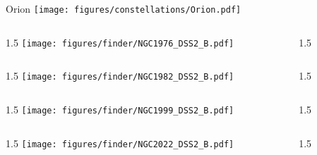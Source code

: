 \documentclass[final]{beamer}
\newlength{\colwidth}
\begin{document}

\begin{frame}[t]{\LARGE Orion}
    \centering
    \texttt{[image: figures/constellations/Orion.pdf]}
\end{frame}


\begin{frame}[t]{}
    \begin{columns}[T]
        \begin{column}{1.5\colwidth}
            \centering
            \texttt{[image: figures/finder/NGC1976\_DSS2\_B.pdf]}
        \end{column}
        \begin{column}{1.5\colwidth}
            \Large
            
        \end{column}
    \end{columns}
    \vspace{\fill}
    \begin{columns}[T]
        \begin{column}{1.5\colwidth}
            \centering
            \texttt{[image: figures/finder/NGC1982\_DSS2\_B.pdf]}
        \end{column}
        \begin{column}{1.5\colwidth}
            \Large
            
        \end{column}
    \end{columns}
\end{frame}


\begin{frame}[t]{}
    \begin{columns}[T]
        \begin{column}{1.5\colwidth}
            \centering
            \texttt{[image: figures/finder/NGC1999\_DSS2\_B.pdf]}
        \end{column}
        \begin{column}{1.5\colwidth}
            \Large
            
        \end{column}
    \end{columns}
    \vspace{\fill}
    \begin{columns}[T]
        \begin{column}{1.5\colwidth}
            \centering
            \texttt{[image: figures/finder/NGC2022\_DSS2\_B.pdf]}
        \end{column}
        \begin{column}{1.5\colwidth}
            \Large
            
        \end{column}
    \end{columns}
\end{frame}
\end{document}
